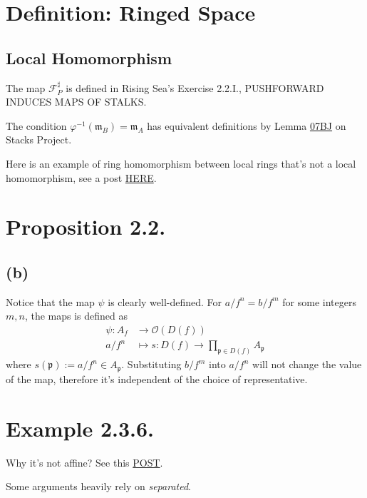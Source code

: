\section{Definition: Ringed Space}

\subsection{Local Homomorphism}

The map $\mathscr F^{\sharp}_P$ is defined in Rising Sea's Exercise 2.2.I., PUSHFORWARD INDUCES MAPS OF STALKS.

The condition $\varphi^{-1}(\mathfrak m_B)=\mathfrak m_A$ has equivalent definitions by Lemma \href{https://stacks.math.columbia.edu/tag/07BH}{07BJ} on Stacks Project.

Here is an example of ring homomorphism between local rings that's not a local homomorphism, see a post \href{https://math.stackexchange.com/questions/3752503/example-of-non-local-homomorphism-on-local-rings}{HERE}.

\section{Proposition 2.2.}

\subsection{(b)}

Notice that the map $\psi$ is clearly well-defined.
For $a/f^n=b/f^m$ for some integers $m,n$, the maps is defined as 
\begin{align*}
    \psi:A_f &\to \mathcal O(D(f))\\
    a/f^n &\mapsto s: D(f)\to\prod_{\mathfrak p\in D(f)}A_{\mathfrak p}
\end{align*}where $s(\mathfrak p):=a/f^n\in A_{\mathfrak p}$. Substituting $b/f^m$ into $a/f^n$ will not change the value of the map, therefore it's independent of the choice of representative.

\section{Example 2.3.6.}

Why it's not affine? See this \href{https://mathoverflow.net/questions/87480/explanation-on-a-scheme-which-is-not-affine-scheme}{POST}. 

Some arguments heavily rely on \textit{separated}.

